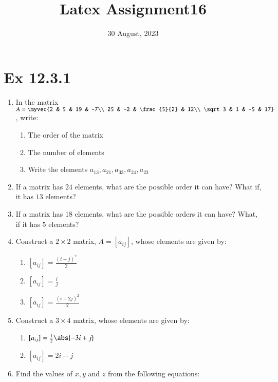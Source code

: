 \documentclass{article}
\theoremstyle{remark}
\begin{document}
\title{Latex Assignment16}
\date{30 August, 2023}
\maketitle
\section*{Ex 12.3.1}
\begin{enumerate}
\item In the matrix $A=\myvec
{2 & 5 & 19 & -7\\
25 & -2 & \frac{5}{2} & 12\\
\sqrt 3 & 1 & -5 & 17}$, write:
\begin{enumerate}[label=(\roman*)]
\item The order of the matrix
\item The number of elements
\item Write the elements $a_{13}, a_{21}, a_{33}, a_{24}, a_{23}$
\end{enumerate}
\item If a matrix has $24$ elements, what are the possible order it can have? What if, it has $13$ elements?
\item If a matrix has $18$ elements, what are the possible orders it can have? What, if it has $5$ elements?
\item Construct a $2\times 2$ matrix, $A=[a_{ij}]$, whose elements are given by:
\begin{enumerate}[label=(\roman*)]
\item $[a_{ij}]=\frac{(i+j)^2}{2}$
\item $[a_{ij}]=\frac{i}{j}$
\item $[a_{ij}]=\frac{(i+2j)^2}{2}$
\end{enumerate}
\item Construct a $3\times 4$ matrix, whose elements are given by:
\begin{enumerate}[label=(\roman*)]
\item $[a_{ij}]=\frac{1}{2}\abs{-3i+j}$
\item $[a_{ij}]=2i-j$
\end{enumerate}
\item Find the values of $x, y$ and $z$ from the following equations:
\end{enumerate}
\end{document}
